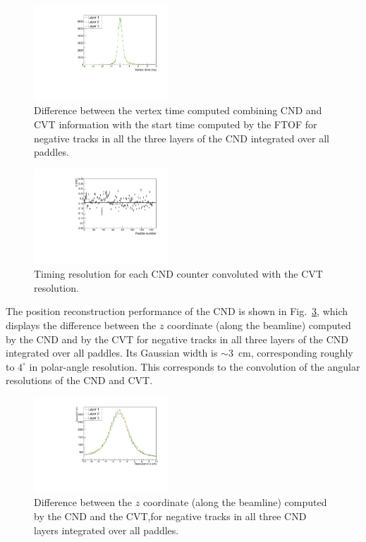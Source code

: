 \begin{figure}[htb]  
\begin{center}
\includegraphics[width=0.45\textwidth]{Figure/canVTPlot.pdf}
\caption {Difference between the vertex time computed combining CND and CVT information with the start time computed by the FTOF for negative tracks in all the three layers of the CND integrated over all paddles.}
\label{fig_performance_deltat_layers}
\end{center}
\end{figure}

\begin{figure}[htb]  
\begin{center}
\includegraphics[width=0.45\textwidth]{Figure/VTsigma.pdf}
\caption {Timing resolution for each CND counter convoluted with the CVT resolution.}
\label{fig_performance_vt_sigma_allpaddles}
\end{center}
\end{figure}

The position reconstruction performance of the CND is shown in Fig.~\ref{fig_performance_deltaz}, which displays the difference between the $z$ coordinate (along the beamline) computed by the CND and by the CVT for negative tracks in all
three layers of the CND integrated over all paddles. Its Gaussian width is $\sim$3~cm, corresponding roughly to $4^\circ$ in polar-angle resolution. This corresponds to the convolution of the angular resolutions of the CND and CVT. 

\begin{figure}[htb]  
\begin{center}
\includegraphics[width=0.45\textwidth]{Figure/canZ.pdf}
\caption {Difference between the $z$ coordinate (along the beamline) computed by the CND and the CVT,for negative tracks in all three CND layers integrated over all paddles.}
\label{fig_performance_deltaz}
\end{center}
\end{figure}

